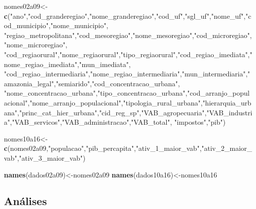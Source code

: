 \documentclass[]{article}
\newenvironment{Shaded}{\begin{snugshade}}{\end{snugshade}}
\newcommand{\KeywordTok}[1]{\textcolor[rgb]{0.13,0.29,0.53}{\textbf{#1}}}
\newcommand{\NormalTok}[1]{#1}
\newcommand{\StringTok}[1]{\textcolor[rgb]{0.31,0.60,0.02}{#1}}
\begin{document}
\begin{Shaded}
\begin{Highlighting}[]
\NormalTok{nomes02a09<-}\KeywordTok{c}\NormalTok{(}\StringTok{"ano"}\NormalTok{,}\StringTok{"cod_granderegiao"}\NormalTok{,}\StringTok{"nome_granderegiao"}\NormalTok{,}\StringTok{"cod_uf"}\NormalTok{,}\StringTok{"sgl_uf"}\NormalTok{,}\StringTok{"nome_uf"}\NormalTok{,}\StringTok{"cod_municipio"}\NormalTok{,}\StringTok{"nome_municipio"}\NormalTok{,}
              \StringTok{"regiao_metropolitana"}\NormalTok{,}\StringTok{"cod_mesoregiao"}\NormalTok{,}\StringTok{"nome_mesoregiao"}\NormalTok{,}\StringTok{"cod_microregiao"}\NormalTok{,}\StringTok{"nome_microregiao"}\NormalTok{,}
              \StringTok{"cod_regiaorural"}\NormalTok{,}\StringTok{"nome_regiaorural"}\NormalTok{,}\StringTok{"tipo_regiaorural"}\NormalTok{,}\StringTok{"cod_regiao_imediata"}\NormalTok{,}\StringTok{"nome_regiao_imediata"}\NormalTok{,}\StringTok{"mun_imediata"}\NormalTok{,}
              \StringTok{"cod_regiao_intermediaria"}\NormalTok{,}\StringTok{"nome_regiao_intermediaria"}\NormalTok{,}\StringTok{"mun_intermediaria"}\NormalTok{,}\StringTok{"amazonia_legal"}\NormalTok{,}\StringTok{"semiarido"}\NormalTok{,}\StringTok{"cod_concentracao_urbana"}\NormalTok{,}
              \StringTok{"nome_concentracao_urbana"}\NormalTok{,}\StringTok{"tipo_concentracao_urbana"}\NormalTok{,}\StringTok{"cod_arranjo_populacional"}\NormalTok{,}\StringTok{"nome_arranjo_populacional"}\NormalTok{,}\StringTok{"tipologia_rural_urbana"}\NormalTok{,}\StringTok{"hierarquia_urbana"}\NormalTok{,}\StringTok{"princ_cat_hier_urbana"}\NormalTok{,}\StringTok{"cid_reg_sp"}\NormalTok{,}\StringTok{"VAB_agropecuaria"}\NormalTok{,}\StringTok{"VAB_industria"}\NormalTok{,}\StringTok{"VAB_servicos"}\NormalTok{,}\StringTok{"VAB_administracao"}\NormalTok{,}\StringTok{"VAB_total"}\NormalTok{,}
              \StringTok{"impostos"}\NormalTok{,}\StringTok{"pib"}\NormalTok{)}

\NormalTok{nomes10a16<-}\KeywordTok{c}\NormalTok{(nomes02a09,}\StringTok{"populacao"}\NormalTok{,}\StringTok{"pib_percapita"}\NormalTok{,}\StringTok{"ativ_1_maior_vab"}\NormalTok{,}\StringTok{"ativ_2_maior_vab"}\NormalTok{,}\StringTok{"ativ_3_maior_vab"}\NormalTok{)}

\KeywordTok{names}\NormalTok{(dados02a09)<-nomes02a09}
\KeywordTok{names}\NormalTok{(dados10a16)<-nomes10a16}
\end{Highlighting}
\end{Shaded}

\hypertarget{analises}{%
\subsection{Análises}\label{analises}}
\end{document}
